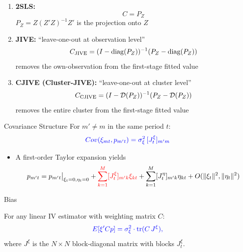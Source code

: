 \documentclass[notes,11pt, aspectratio=169]{beamer}
\DeclareMathOperator{\tr}{tr}
\DeclareMathOperator{\diag}{diag}
\begin{document}
\begin{frame}{}

\begin{enumerate}
    \item \textbf{2SLS:} 
    \[
    C = P_Z
    \]
    $P_Z = Z(Z'Z)^{-1}Z'$ is the projection onto $Z$
    \item \textbf{JIVE:} ``leave-one-out at observation level''
    \[
    C_{\textup{JIVE}} = (I - \diag(P_Z))^{-1}(P_Z - \diag(P_Z))
    \]
    removes the own-observation from the first-stage fitted value
    \item \textbf{CJIVE (Cluster-JIVE):} ``leave-one-out at cluster level''
    \[
    C_{\textup{CJIVE}} = (I - \mathcal{D}(P_Z))^{-1}(P_Z - \mathcal{D}(P_Z))
    \]
    removes the entire cluster from the first-stage fitted value
\end{enumerate}
    
\end{frame}


\begin{frame}{Covariance Structure}
   For $m' \neq m$ in the same period $t$:
\[
\textcolor{blue}{Cov(\xi_{mt}, p_{m't}) = \sigma_\xi^2 \, [J_t^\xi]_{m'm}}
\]

\begin{itemize}
    \item A first-order Taylor expansion yields
\[ 
p_{m't} = p_{m't}\big|_{\xi_t=0, \eta_t=0} + \textcolor{red}{\sum_{k=1}^M [J_t^\xi]_{m'k} \xi_{kt} }+ \sum_{k=1}^M [J_t^\eta]_{m'k} \eta_{kt} + O(\|\xi_t\|^2, \|\eta_t\|^2)
\]
\end{itemize}

\end{frame}


\begin{frame}{Bias}

For any linear IV estimator with weighting matrix $C$:
\[
    \textcolor{blue}{E[\xi' C p] = \sigma_\xi^2 \cdot \tr(C \, J^\xi),}
\]
where $J^\xi$ is the $N \times N$ block-diagonal matrix with blocks $J_t^\xi$.

\end{frame}
\end{document}
